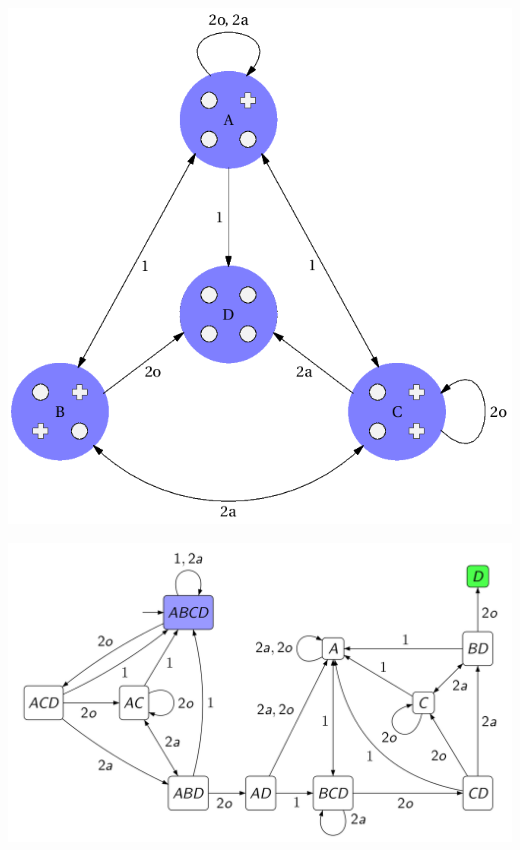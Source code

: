 \documentclass[a4paper,11pt]{article}
\begin{document}
\includegraphics[width=0.5\linewidth]{../images/BA_graphe_final}

\includegraphics[width=\linewidth]{../images/BA_determinisation}
\end{document}

